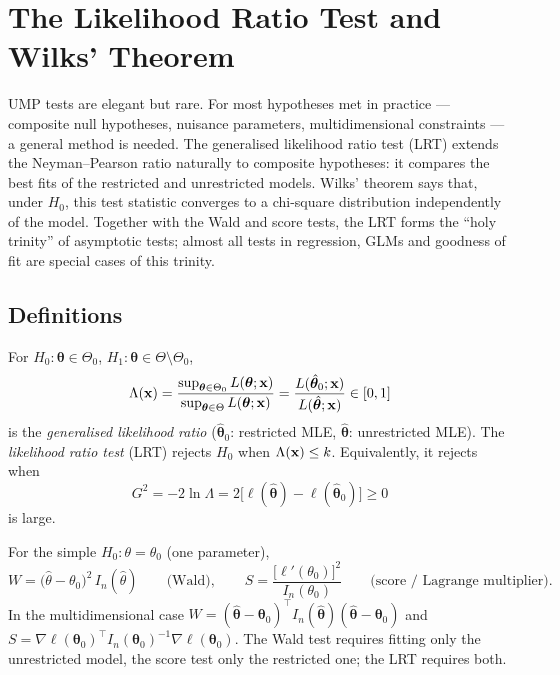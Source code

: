 \documentclass[main.tex]{subfiles}
\begin{document}
\chapter{The Likelihood Ratio Test and Wilks' Theorem}\label{ch:lrt}

UMP tests are elegant but rare. For most hypotheses met in practice --- composite null hypotheses, nuisance parameters, multidimensional constraints --- a general method is needed. The generalised likelihood ratio test (LRT) extends the Neyman--Pearson ratio naturally to composite hypotheses: it compares the best fits of the restricted and unrestricted models. Wilks' theorem says that, under $H_0$, this test statistic converges to a chi-square distribution independently of the model. Together with the Wald and score tests, the LRT forms the ``holy trinity'' of asymptotic tests; almost all tests in regression, GLMs and goodness of fit are special cases of this trinity.

\section{Definitions}

\begin{definition}
For $H_0:\bm\theta\in\Theta_0$, $H_1:\bm\theta\in\Theta\setminus\Theta_0$,
\[
\Lambda(\mathbf{x})=\frac{\sup_{\bm\theta\in\Theta_0}L(\bm\theta;\mathbf{x})}{\sup_{\bm\theta\in\Theta}L(\bm\theta;\mathbf{x})}=\frac{L(\hat{\bm\theta}_0;\mathbf{x})}{L(\hat{\bm\theta};\mathbf{x})}\in[0,1]
\]
is the \emph{generalised likelihood ratio} ($\hat{\bm\theta}_0$: restricted MLE, $\hat{\bm\theta}$: unrestricted MLE). The \emph{likelihood ratio test} (LRT) rejects $H_0$ when $\Lambda(\mathbf{x})\le k$. Equivalently, it rejects when
\[
G^2=-2\ln\Lambda=2\big[\ell(\hat{\bm\theta})-\ell(\hat{\bm\theta}_0)\big]\ge0
\]
is large.
\end{definition}

\begin{definition}
For the simple $H_0:\theta=\theta_0$ (one parameter),
\[
W=\big(\hat\theta-\theta_0\big)^2\,I_n(\hat\theta)\qquad\text{(Wald)},\qquad
S=\frac{\big[\ell'(\theta_0)\big]^2}{I_n(\theta_0)}\qquad\text{(score / Lagrange multiplier)}.
\]
In the multidimensional case $W=(\hat{\bm\theta}-\bm\theta_0)^\top I_n(\hat{\bm\theta})(\hat{\bm\theta}-\bm\theta_0)$ and $S=\nabla\ell(\bm\theta_0)^\top I_n(\bm\theta_0)^{-1}\nabla\ell(\bm\theta_0)$. The Wald test requires fitting only the unrestricted model, the score test only the restricted one; the LRT requires both.
\end{definition}
\end{document}
